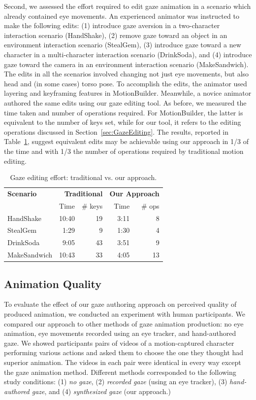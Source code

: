 Second, we assessed the effort required to edit gaze animation in a scenario which already contained eye movements. An experienced animator was instructed to make the following edits: (1) introduce gaze aversion in a two-character interaction scenario (HandShake), (2) remove gaze toward an object in an environment interaction scenario (StealGem), (3) introduce gaze toward a new character in a multi-character interaction scenario (DrinkSoda), and (4) introduce gaze toward the camera in an environment interaction scenario (MakeSandwich). The edits in all the scenarios involved changing not just eye movements, but also head and (in some cases) torso pose. To accomplish the edits, the animator used layering and keyframing features in MotionBuilder. Meanwhile, a novice animator authored the same edits using our gaze editing tool. As before, we measured the time taken and number of operations required. For MotionBuilder, the latter is equivalent to the number of keys set, while for our tool, it refers to the editing operations discussed in Section~\ref{sec:GazeEditing}. The results, reported in Table~\ref{tab:GazeEditingEffortResults}, suggest equivalent edits may be achievable using our approach in 1/3 of the time and with 1/3 the number of operations required by traditional motion editing.
%
\begin{table}
\small
\centering
\def\arraystretch{1.5}
\begin{tabular}{lrrrr}
\hline
\textbf{Scenario} & \multicolumn{2}{r}{\textbf{Traditional}} & \multicolumn{2}{r}{\textbf{Our Approach}} \\
\cline{2-5}
& Time & \# keys & Time & \# ops  \\
\hline
HandShake & 10:40 & 19 & 3:11 & 8 \\
StealGem & 1:29 & 9 & 1:30 & 4 \\
DrinkSoda & 9:05 & 43 & 3:51 & 9 \\
MakeSandwich & 10:43 & 33 & 4:05 & 13 \\
\hline
\end{tabular}
\caption{Gaze editing effort: traditional vs. our approach.}
\label{tab:GazeEditingEffortResults}
\end{table}

\subsection{Animation Quality}
\label{sec:GazeAnimationQualityEvaluation}

To evaluate the effect of our gaze authoring approach on perceived quality of produced animation, we conducted an experiment with human participants. We compared our approach to other methods of gaze animation production: no eye animation, eye movements recorded using an eye tracker, and hand-authored gaze. We showed participants pairs of videos of a motion-captured character performing various actions and asked them to choose the one they thought had superior animation. The videos in each pair were identical in every way except the gaze animation method. Different methods corresponded to the following study conditions: (1) \emph{no gaze}, (2) \emph{recorded gaze} (using an eye tracker), (3) \emph{hand-authored gaze}, and (4) \emph{synthesized gaze} (our approach.)

